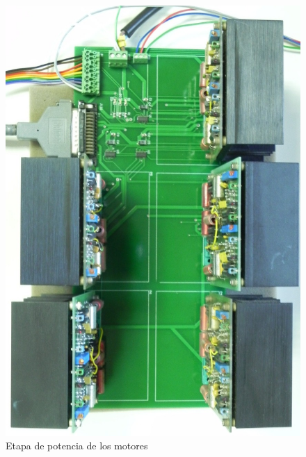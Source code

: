 \begin{figure}[htb!]
\centering
\includegraphics[scale=0.6]{FiguresP/TarjetaMotores}
\caption{Etapa de potencia de los motores}
\label{fig:etapaPotencia}
\end{figure}










